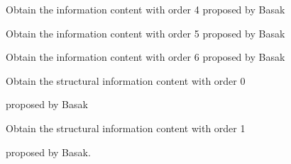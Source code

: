 \documentclass[letterpaper,10pt,english]{sphinxmanual}
\begin{document}
\begin{fulllineitems}
\label{reference/basak:basak.CalculateBasakIC4}
Obtain the information content with order 4 proposed by Basak

\end{fulllineitems}


\begin{fulllineitems}
\label{reference/basak:basak.CalculateBasakIC5}
Obtain the information content with order 5 proposed by Basak

\end{fulllineitems}


\begin{fulllineitems}
\label{reference/basak:basak.CalculateBasakIC6}
Obtain the information content with order 6 proposed by Basak

\end{fulllineitems}


\begin{fulllineitems}
\label{reference/basak:basak.CalculateBasakSIC0}
Obtain the structural information content with order 0

proposed by Basak

\end{fulllineitems}


\begin{fulllineitems}
\label{reference/basak:basak.CalculateBasakSIC1}
Obtain the structural information content with order 1

proposed by Basak.

\end{fulllineitems}

\end{document}
